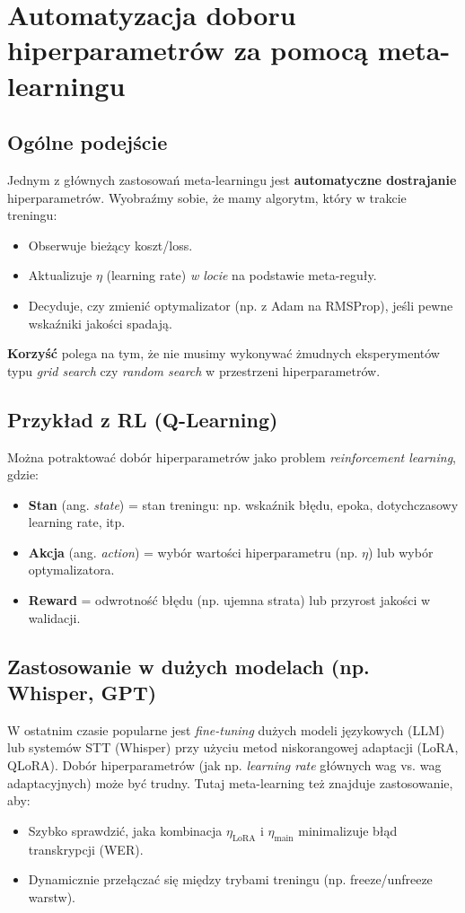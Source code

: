 \documentclass[12pt,a4paper]{article}
\begin{document}
\section{Automatyzacja doboru hiperparametrów za pomocą meta-learningu}

\subsection{Ogólne podejście}

Jednym z głównych zastosowań meta-learningu jest \textbf{automatyczne dostrajanie} hiperparametrów. Wyobraźmy sobie, że mamy algorytm, który w trakcie treningu:
\begin{itemize}
    \item Obserwuje bieżący koszt/loss.
    \item Aktualizuje \(\eta\) (learning rate) \textit{w locie} na podstawie meta-reguły.
    \item Decyduje, czy zmienić optymalizator (np. z Adam na RMSProp), jeśli pewne wskaźniki jakości spadają.
\end{itemize}

\textbf{Korzyść} polega na tym, że nie musimy wykonywać żmudnych eksperymentów typu \emph{grid search} czy \emph{random search} w przestrzeni hiperparametrów.

\subsection{Przykład z RL (Q-Learning)}

Można potraktować dobór hiperparametrów jako problem \emph{reinforcement learning}, gdzie:
\begin{itemize}
    \item \textbf{Stan} (ang. \emph{state}) = stan treningu: np. wskaźnik błędu, epoka, dotychczasowy learning rate, itp.
    \item \textbf{Akcja} (ang. \emph{action}) = wybór wartości hiperparametru (np. \(\eta\)) lub wybór optymalizatora.
    \item \textbf{Reward} = odwrotność błędu (np. ujemna strata) lub przyrost jakości w walidacji.
\end{itemize}

\subsection{Zastosowanie w dużych modelach (np. Whisper, GPT)}

W ostatnim czasie popularne jest \emph{fine-tuning} dużych modeli językowych (LLM) lub systemów STT (Whisper) przy użyciu metod niskorangowej adaptacji (LoRA, QLoRA). Dobór hiperparametrów (jak np. \emph{learning rate} głównych wag vs. wag adaptacyjnych) może być trudny. Tutaj meta-learning też znajduje zastosowanie, aby:
\begin{itemize}
    \item Szybko sprawdzić, jaka kombinacja \(\eta_{\text{LoRA}}\) i \(\eta_{\text{main}}\) minimalizuje błąd transkrypcji (WER).
    \item Dynamicznie przełączać się między trybami treningu (np. freeze/unfreeze warstw).
\end{itemize}
\end{document}
